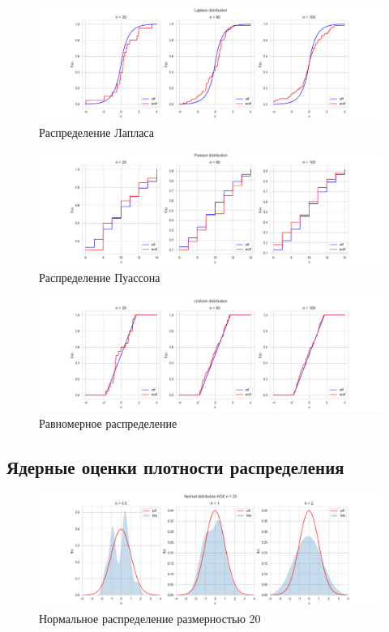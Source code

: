 \documentclass[a4paper,14pt]{article}
\begin{document}
	\begin{figure}[H]
		\centering
		\includegraphics[scale=0.35]{../image/lab4/lab4_ecdf_laplace.png}
		\caption{Распределение Лапласа}
	\end{figure}
	
	\begin{figure}[H]
		\centering
		\includegraphics[scale=0.35]{../image/lab4/lab4_ecdf_poisson.png}
		\caption{Распределение Пуассона}
	\end{figure}
	
	\begin{figure}[H]
		\centering
		\includegraphics[scale=0.35]{../image/lab4/lab4_ecdf_uniform.png}
		\caption{Равномерное распределение}
	\end{figure}
	\subsection{Ядерные оценки плотности распределения}
	\begin{figure}[H]
		\centering
		\includegraphics[scale=0.35]{../image/lab4/lab4_kde_norm_20.png}
		\caption{Нормальное распределение размерностью 20}
	\end{figure}
	
\end{document}
